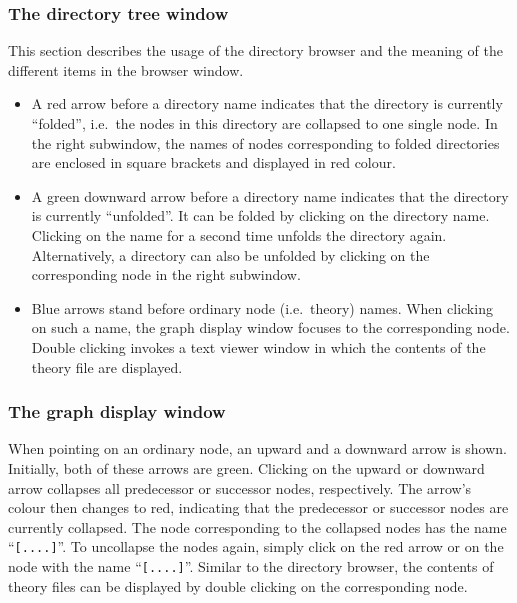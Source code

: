 \subsubsection*{The directory tree window}

This section describes the usage of the directory browser and the
meaning of the different items in the browser window.
\begin{itemize}
  
\item A red arrow before a directory name indicates that the directory
  is currently ``folded'', i.e.~the nodes in this directory are
  collapsed to one single node. In the right subwindow, the names of
  nodes corresponding to folded directories are enclosed in square
  brackets and displayed in red colour.
  
\item A green downward arrow before a directory name indicates that
  the directory is currently ``unfolded''. It can be folded by
  clicking on the directory name.  Clicking on the name for a second
  time unfolds the directory again.  Alternatively, a directory can
  also be unfolded by clicking on the corresponding node in the right
  subwindow.
  
\item Blue arrows stand before ordinary node (i.e.~theory) names. When
  clicking on such a name, the graph display window focuses to the
  corresponding node. Double clicking invokes a text viewer window in
  which the contents of the theory file are displayed.

\end{itemize}


\subsubsection*{The graph display window}

When pointing on an ordinary node, an upward and a downward arrow is
shown.  Initially, both of these arrows are green. Clicking on the
upward or downward arrow collapses all predecessor or successor nodes,
respectively. The arrow's colour then changes to red, indicating that
the predecessor or successor nodes are currently collapsed. The node
corresponding to the collapsed nodes has the name ``{\tt [....]}''. To
uncollapse the nodes again, simply click on the red arrow or on the
node with the name ``{\tt [....]}''. Similar to the directory browser,
the contents of theory files can be displayed by double clicking on
the corresponding node.


